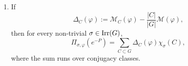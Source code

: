 \begin{theorem}
\begin{enumerate}[label=\textup{(\roman*)}]
\begin{equation}
        =
        \frac{|C|}{|G|}\mathcal M(\varphi)
        +\frac{|C|}{|G|}
          \sum_{\varrho\neq\mathbf 1}
            \chi_\varrho(C^{-1})\Pi_{\varrho,\varphi}(e^{-P}).
      \end{equation}
      In particular,
      \[
        \sum_{n\le N}e^{-Pn}p_{n,C}(\varphi)
        =
        \frac{|C|}{|G|}\log N+\mathcal M_C(\varphi)+O(N^{-1}).
      \]
    \item If
      \[
        \Delta_C(\varphi)
        :=
        \mathcal M_C(\varphi)-\frac{|C|}{|G|}\mathcal M(\varphi),
      \]
      then for every non-trivial \(\sigma\in\operatorname{Irr}(G)\),
      \begin{equation}\label{eq:holder-transfer-fourier}
        \Pi_{\sigma,\varphi}(e^{-P})
        =
        \sum_{C\subset G}\Delta_C(\varphi)\chi_\sigma(C),
      \end{equation}
      where the sum runs over conjugacy classes.
  \end{enumerate}
\end{theorem}

